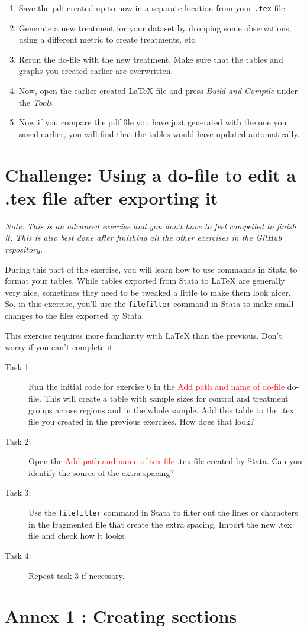 \documentclass[12pts]{report}
\begin{document}
\begin{enumerate}
	\item Save the pdf created up to now in a separate location from your \texttt{.tex} file. 
	\item Generate a new treatment for your dataset by dropping some observations, using a different metric to create treatments, etc. 
	\item Rerun the do-file with the new treatment. Make sure that the tables and graphs you created earlier are overwritten. 
	\item Now, open the earlier created {\LaTeX} file and press \textit{Build and Compile} under the \textit{Tools}.
	\item Now if you compare the pdf file you have just generated with the one you saved earlier, you will find that the tables would have updated automatically. 
\end{enumerate}

\section*{Challenge: Using a do-file to edit a .tex file after exporting it}
\textit{Note: This is an advanced exercise and you don't have to feel compelled to finish it. This is also best done after finishing all the other exercises in the GitHub repository.}
 
During this part of the exercise, you will learn how to use commands in Stata to format your tables. While tables exported from Stata to {\LaTeX} are generally very nice, sometimes they need to be tweaked a little to make them look nicer. So, in this exercise, you'll use the \texttt{filefilter} command in Stata to make small changes to the files exported by Stata. 

This exercise requires more familiarity with {\LaTeX} than the previous. Don't worry if you can't complete it. 

\begin{description}
	\item[Task 1:] Run the initial code for exercise 6 in the \textcolor{red}{Add path and name of do-file} do-file. This will create a table with sample sizes for control and treatment groups across regions and in the whole sample. Add this table to the .tex file you created in the previous exercises. How does that look?
	\item[Task 2:] Open the \textcolor{red}{Add path and name of tex file} .tex file created by Stata. Can you identify the source of the extra spacing?
	\item[Task 3:] Use the \texttt{filefilter} command in Stata to filter out the lines or characters in the fragmented file that create the extra spacing. Import the new .tex file and check how it looks.
	\item[Task 4:] Repeat task 3 if necessary.
\end{description}


\newpage
\section*{Annex 1 : Creating sections}
\end{document}
